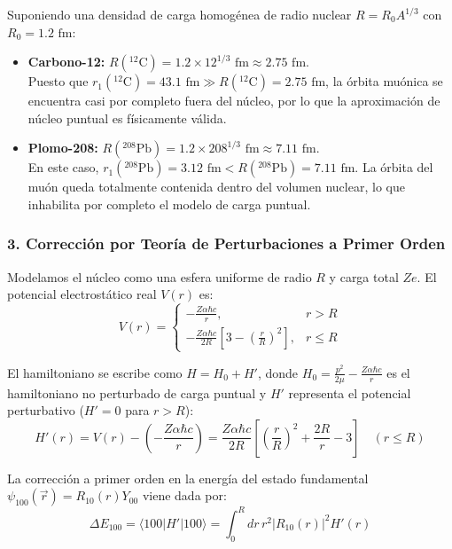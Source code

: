 \begin{problema}
Suponiendo una densidad de carga homogénea de radio nuclear $R = R_0 A^{1/3}$ con $R_0 = 1.2\text{ fm}$:
\begin{itemize}
    \item \textbf{Carbono-12:} $R({}^{12}\text{C}) = 1.2 \times 12^{1/3}\text{ fm} \approx 2.75\text{ fm}$. \\
    Puesto que $r_1({}^{12}\text{C}) = 43.1\text{ fm} \gg R({}^{12}\text{C}) = 2.75\text{ fm}$, la órbita muónica se encuentra casi por completo fuera del núcleo, por lo que la aproximación de núcleo puntual es físicamente válida.
    
    \item \textbf{Plomo-208:} $R({}^{208}\text{Pb}) = 1.2 \times 208^{1/3}\text{ fm} \approx 7.11\text{ fm}$. \\
    En este caso, $r_1({}^{208}\text{Pb}) = 3.12\text{ fm} < R({}^{208}\text{Pb}) = 7.11\text{ fm}$. La órbita del muón queda totalmente contenida dentro del volumen nuclear, lo que inhabilita por completo el modelo de carga puntual.
\end{itemize}

\subsubsection*{3. Corrección por Teoría de Perturbaciones a Primer Orden}

Modelamos el núcleo como una esfera uniforme de radio $R$ y carga total $Z e$. El potencial electrostático real $V(r)$ es:
\begin{equation*}
V(r) = 
\begin{cases} 
-\frac{Z \alpha \hbar c}{r}, & r > R \\ 
-\frac{Z \alpha \hbar c}{2 R} \left[ 3 - \left( \frac{r}{R} \right)^2 \right], & r \le R 
\end{cases}
\end{equation*}

El hamiltoniano se escribe como $H = H_0 + H'$, donde $H_0 = \frac{p^2}{2\mu} - \frac{Z\alpha\hbar c}{r}$ es el hamiltoniano no perturbado de carga puntual y $H'$ representa el potencial perturbativo ($H' = 0$ para $r > R$):
\begin{equation*}
H'(r) = V(r) - \left(-\frac{Z\alpha\hbar c}{r}\right) = \frac{Z\alpha\hbar c}{2R} \left[ \left(\frac{r}{R}\right)^2 + \frac{2R}{r} - 3 \right] \quad (r \le R)
\end{equation*}

La corrección a primer orden en la energía del estado fundamental $\psi_{100}(\vec{r}) = R_{10}(r) Y_{00}$ viene dada por:
\begin{equation*}
\Delta E_{100} = \langle 100 | H' | 100 \rangle = \int_0^R dr \, r^2 \left| R_{10}(r) \right|^2 H'(r)
\end{equation*}


\end{problema}

